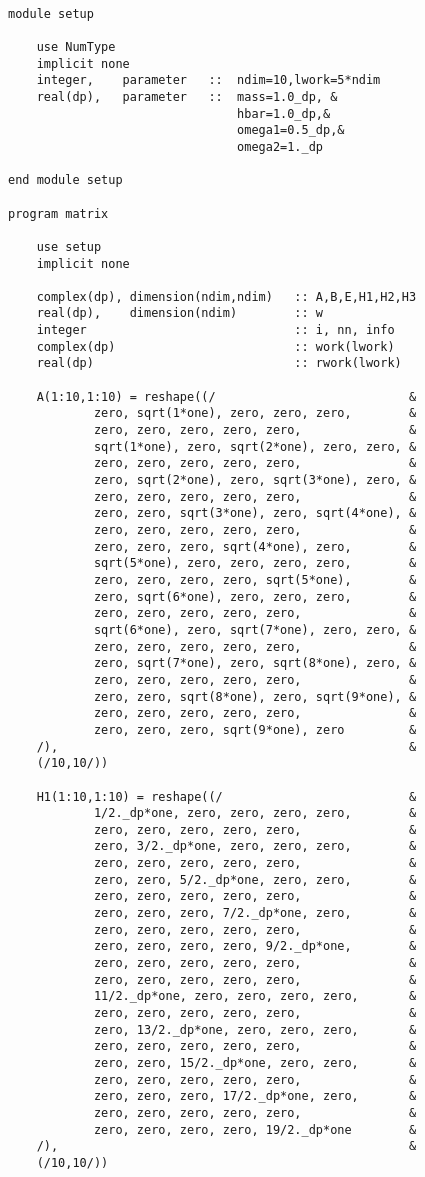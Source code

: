 \documentclass[12pt]{article}
\begin{document}
\begin{lstlisting}[frame=single,caption={ {\tt mtest.f95}},label=module]

module setup

	use NumType
	implicit none
	integer,	parameter	::  ndim=10,lwork=5*ndim
	real(dp),	parameter	::  mass=1.0_dp, &
				        	    hbar=1.0_dp,&
					 		    omega1=0.5_dp,& 
							    omega2=1._dp
	
end module setup

program matrix

	use setup
	implicit none

	complex(dp), dimension(ndim,ndim)	:: A,B,E,H1,H2,H3
	real(dp),	 dimension(ndim)		:: w
	integer 							:: i, nn, info
	complex(dp) 						:: work(lwork)
	real(dp) 							:: rwork(lwork)

	A(1:10,1:10) = reshape((/	             		    &
			zero, sqrt(1*one), zero, zero, zero,		&
			zero, zero, zero, zero, zero,				&
			sqrt(1*one), zero, sqrt(2*one), zero, zero,	&
			zero, zero, zero, zero, zero,				&
			zero, sqrt(2*one), zero, sqrt(3*one), zero,	&
			zero, zero, zero, zero, zero,				&
			zero, zero, sqrt(3*one), zero, sqrt(4*one), &
			zero, zero, zero, zero, zero,				&
			zero, zero, zero, sqrt(4*one), zero,		&
			sqrt(5*one), zero, zero, zero, zero,		&
			zero, zero, zero, zero, sqrt(5*one),		&
			zero, sqrt(6*one), zero, zero, zero,		&
			zero, zero, zero, zero, zero,				&
			sqrt(6*one), zero, sqrt(7*one), zero, zero,	&
			zero, zero, zero, zero, zero,				&
			zero, sqrt(7*one), zero, sqrt(8*one), zero,	&
			zero, zero, zero, zero, zero,				&
			zero, zero, sqrt(8*one), zero, sqrt(9*one),	&
			zero, zero, zero, zero, zero,				&
			zero, zero, zero, sqrt(9*one), zero 		&
	/), 												&
	(/10,10/))

	H1(1:10,1:10) = reshape((/  						&
			1/2._dp*one, zero, zero, zero, zero,		&
			zero, zero, zero, zero, zero,				&
			zero, 3/2._dp*one, zero, zero, zero,		&
			zero, zero, zero, zero, zero,				&
			zero, zero, 5/2._dp*one, zero, zero,		&
			zero, zero, zero, zero, zero,				&
			zero, zero, zero, 7/2._dp*one, zero,		&
			zero, zero, zero, zero, zero,				&
			zero, zero, zero, zero, 9/2._dp*one,		&
			zero, zero, zero, zero, zero,				&
			zero, zero, zero, zero, zero,				&
			11/2._dp*one, zero, zero, zero, zero,		&
			zero, zero, zero, zero, zero,				&
			zero, 13/2._dp*one, zero, zero, zero,		&
			zero, zero, zero, zero, zero,				&
			zero, zero, 15/2._dp*one, zero, zero,		&
			zero, zero, zero, zero, zero,				&
			zero, zero, zero, 17/2._dp*one, zero,		&
			zero, zero, zero, zero, zero,				&
			zero, zero, zero, zero, 19/2._dp*one 		&
	/), 												&
	(/10,10/))


\end{lstlisting}
\end{document}
